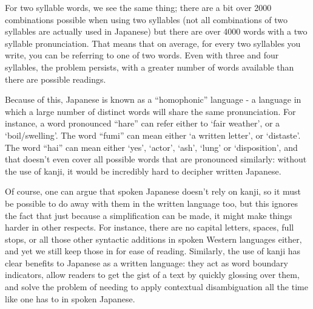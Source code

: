 \documentclass[11pt, b5paper, twoside, openright, onecolumn]{book}
\begin{document}
For two syllable words‚ we see the same thing; there are a bit over 2000 combinations possible when using two syllables (not all combinations of two syllables are actually used in Japanese) but there are over 4000 words with a two syllable pronunciation. That means that on average‚ for every two syllables you write‚ you can be referring to one of two words. Even with three and four syllables‚ the problem persists‚ with a greater number of words available than there are possible readings.

Because of this‚ Japanese is known as a “homophonic” language - a language in which a large number of distinct words will share the same pronunciation. For instance‚ a word pronounced “hare” can refer either to ‘fair weather’‚ or a ‘boil/swelling’. The word “fumi” can mean either ‘a written letter’‚ or ‘distaste’. The word “hai” can mean either ‘yes’‚ ‘actor’‚ ‘ash’‚ ‘lung’ or ‘disposition’‚ and that doesn’t even cover all possible words that are pronounced similarly: without the use of kanji‚ it would be incredibly hard to decipher written Japanese.

Of course‚ one can argue that spoken Japanese doesn’t rely on kanji‚ so it must be possible to do away with them in the written language too‚ but this ignores the fact that just because a simplification can be made‚ it might make things harder in other respects. For instance‚ there are no capital letters‚ spaces‚ full stops‚ or all those other syntactic additions in spoken Western languages either‚ and yet we still keep those in for ease of reading. Similarly‚ the use of kanji has clear benefits to Japanese as a written language: they act as word boundary indicators‚ allow readers to get the gist of a text by quickly glossing over them‚ and solve the problem of needing to apply contextual disambiguation all the time like one has to in spoken Japanese.
\end{document}
